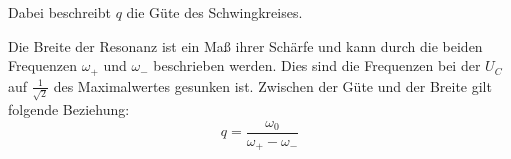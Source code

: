 Dabei beschreibt $q$ die Güte des Schwingkreises.

Die Breite der Resonanz ist ein Maß ihrer Schärfe und kann durch die beiden Frequenzen $\omega_+$ und $\omega_-$ beschrieben werden. Dies sind
die Frequenzen bei der $U_C$ auf $\frac{1}{\sqrt{2}}$ des Maximalwertes gesunken ist. Zwischen der Güte und
der Breite gilt folgende Beziehung:
\begin{equation}
  q = \frac{\omega_0}{\omega_+ - \omega_-}
\end{equation}
